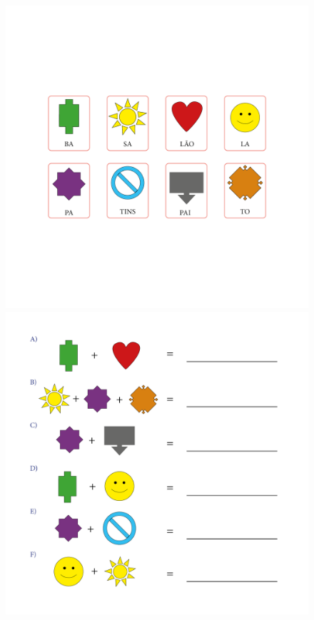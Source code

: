 \begin{figure}[htpb!]
\includegraphics[width=\textwidth]{media/flag1.png}

\includegraphics[width=\textwidth]{media/flag2.png}
\end{figure}


